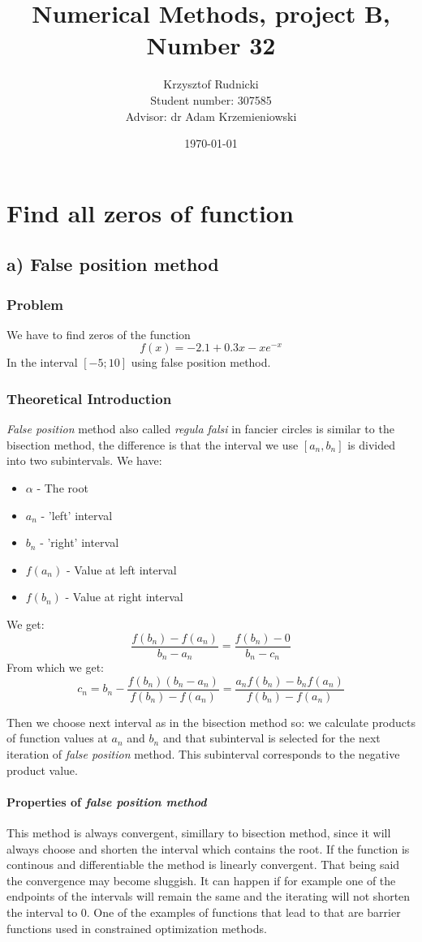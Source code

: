 \documentclass[12pt]{report}
\title{Numerical Methods, project B, Number 32}
\author{Krzysztof Rudnicki\\ Student number: 307585 \\ Advisor: dr Adam Krzemieniowski}
\date{\today}
\begin{document}
\maketitle
\tableofcontents

\chapter{Find all zeros of function}

\section{a) False position method}

\subsection{Problem}

We have to find zeros of the function
\[ f(x) = -2.1 + 0.3x - xe^{-x} \]
In the interval $[-5; 10]$ using false position method.

\subsection{Theoretical Introduction}
\emph{False position} method also called \emph{regula falsi} in fancier circles is similar to the bisection method, the difference is that the interval we use $[a_n, b_n]$ is divided into two subintervals. We have:
\begin{itemize}
\item $\alpha$ - The root
\item $a_n$ - 'left' interval
\item $b_n$ - 'right' interval
\item $f(a_n)$ - Value at left interval
\item $f(b_n)$ - Value at right interval
\end{itemize}

We get:
\[ \frac{f(b_n) - f(a_n)}{b_n - a_n} = \frac{f(b_n) - 0}{b_n - c_n} \]
From which we get:
\[ c_n = b_n - \frac{f(b_n)(b_n - a_n)}{f(b_n) - f(a_n)} = \frac{a_nf(b_n) - b_n f(a_n)}{f(b_n)-f(a_n)} \]

Then we choose next interval as in the bisection method so: we calculate products of function values at $a_n$ and $b_n$ and that subinterval is selected for the next iteration of \emph{false position} method. This subinterval corresponds to the negative product value.

\subsubsection{Properties of \emph{false position method}}
This method is always convergent, simillary to bisection method, since it will always choose and shorten the interval which contains the root. If the function is continous and differentiable the method is linearly convergent. That being said the convergence may become sluggish. It can happen if for example one of the endpoints of the intervals will remain the same and the iterating will not shorten the interval to 0. One of the examples of functions that lead to that are barrier functions used in constrained optimization methods.
\end{document}
